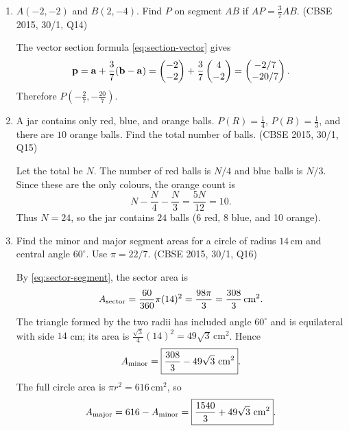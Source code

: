 \begin{enumerate}[label=\textbf{Q\arabic*.},ref=\arabic*,start=11]
\item $A(-2,-2)$ and $B(2,-4)$. Find $P$ on segment $AB$ if $AP=\frac37 AB$. \hfill (CBSE 2015, 30/1, Q14)

\solution The vector section formula \eqref{eq:section-vector} gives
\[
\mathbf p=\mathbf a+\frac37(\mathbf b-\mathbf a)
=\begin{pmatrix}-2\\-2\end{pmatrix}+\frac37\begin{pmatrix}4\\-2\end{pmatrix}
=\begin{pmatrix}-2/7\\-20/7\end{pmatrix}.
\]
Therefore $\boxed{P\left(-\frac27,-\frac{20}{7}\right)}$.

\item A jar contains only red, blue, and orange balls. $P(R)=\frac14$, $P(B)=\frac13$, and there are $10$ orange balls. Find the total number of balls. \hfill (CBSE 2015, 30/1, Q15)

\solution Let the total be $N$. The number of red balls is $N/4$ and blue balls is $N/3$. Since these are the only colours, the orange count is
\[
N-\frac N4-\frac N3=\frac{5N}{12}=10.
\]
Thus $N=24$, so the jar contains $\boxed{24}$ balls (6 red, 8 blue, and 10 orange).

\item Find the minor and major segment areas for a circle of radius $14\,\mathrm{cm}$ and central angle $60^\circ$. Use $\pi=22/7$. \hfill (CBSE 2015, 30/1, Q16)

\solution By \eqref{eq:sector-segment}, the sector area is
\[
A_{\rm sector}=\frac{60}{360}\pi(14)^2=\frac{98\pi}{3}=\frac{308}{3}\,\mathrm{cm}^2.
\]
The triangle formed by the two radii has included angle $60^\circ$ and is equilateral with side $14$ cm; its area is $\frac{\sqrt3}{4}(14)^2=49\sqrt3\,\mathrm{cm}^2$. Hence
\[
A_{\rm minor}=\boxed{\frac{308}{3}-49\sqrt3\ \mathrm{cm}^2}.
\]
The full circle area is $\pi r^2=616\,\mathrm{cm}^2$, so
\[
A_{\rm major}=616-A_{\rm minor}
=\boxed{\frac{1540}{3}+49\sqrt3\ \mathrm{cm}^2}.
\]


\end{enumerate}
